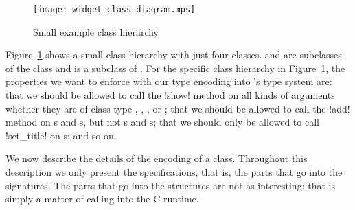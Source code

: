 \documentclass[finalversion]{usetex-v1}
\begin{document}
\begin{figure}[htp]
  \centering
  \texttt{[image: widget-class-diagram.mps]}
  \caption{Small example class hierarchy}
  \label{fig:class-hierarchy}
\end{figure}

Figure~\ref{fig:class-hierarchy} shows a small class hierarchy with
just four classes.  and  are
subclasses of the class  and  is a
subclass of .  For the specific class hierarchy
in Figure~\ref{fig:class-hierarchy}, the properties we want to enforce
with our type encoding into \sml's type system are: that we should be
allowed to call the !show! method on all kinds of arguments whether
they are of class type , ,
, or ; that we should be
allowed to call the !add! method on s and
s, but not s and
s; that we should only be allowed to call !set_title!
on s; and so on.

We now describe the details of the encoding of a class.
Throughout this description we only present the \sml specifications,
that is, the parts that go into the signatures. The parts that go into
the structures are not as interesting: that is simply a matter of
calling into the C runtime.
\end{document}
